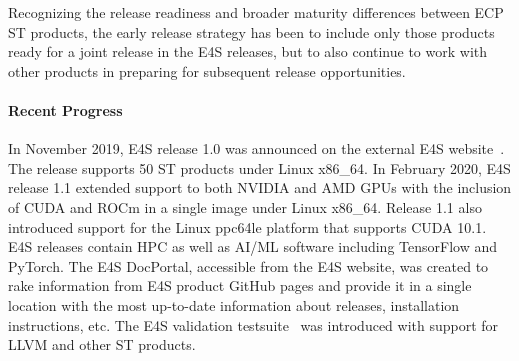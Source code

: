 Recognizing the release readiness and broader maturity differences between ECP ST products, the early release strategy has been to include only those products ready for a joint release in the E4S releases, but to also continue to work with other products in preparing for subsequent release opportunities.

\paragraph{Recent Progress}

In November 2019, E4S release 1.0 was announced on the external E4S website~\cite{e4s:homepage}. The release supports 50 ST products under Linux x86_64. In February 2020, E4S release 1.1 extended support to both NVIDIA and AMD GPUs with the inclusion of CUDA and ROCm in a single image under Linux x86_64. Release 1.1 also introduced support for the Linux ppc64le platform that supports CUDA 10.1. E4S releases contain HPC as well as AI/ML software including TensorFlow and PyTorch. The E4S DocPortal, accessible from the E4S website, was created to rake information from E4S product GitHub pages and provide it in a single location with the most up-to-date information about releases, installation instructions, etc. The E4S validation testsuite~\cite{e4s:validation} was introduced with support for LLVM and other ST products.



